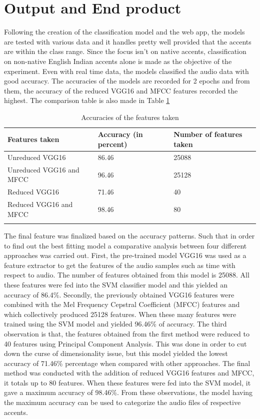 \documentclass[pdflatex]{sn-jnl}%
\theoremstyle{thmstyleone}%
\theoremstyle{thmstyletwo}%
\theoremstyle{thmstylethree}%
\begin{document}
\section{Output and End product}
Following the creation of the classification model and the web app, the models are tested with various data and it handles pretty well provided that the accents are within the class range. Since the focus isn’t on native accents, classification on non-native English Indian accents alone is made as the objective of the experiment. Even with real time data, the models classified the audio data with good accuracy. The accuracies of the models are recorded for 2 epochs and from them, the accuracy of the reduced VGG16 and MFCC features recorded the highest. The comparison table is also made in Table \ref{compare}

\begin{table}[!htbp]
\begin{center}
\caption{Accuracies of the features taken}\label{compare}%
\begin{tabular}{@{}lll@{}}
\toprule
Features taken & Accuracy (in percent) & Number of features taken\\
\midrule
Unreduced VGG16 & 86.46 & 25088 \\
Unreduced VGG16 and MFCC & 96.46 & 25128  \\
Reduced VGG16 & 71.46 & 40 \\
Reduced VGG16 and MFCC & 98.46 & 80 \\
\botrule
\end{tabular}
\end{center}
\end{table}

The final feature was finalized based on the accuracy patterns. Such that in order to find out the best fitting model a comparative analysis between four different approaches was carried out. First, the pre-trained model VGG16 was used as a feature extractor to get the features of the audio samples such as time with respect to audio. The number of features obtained from this model is 25088. All these features were fed into the SVM classifier model and this yielded an accuracy of 86.4\%. Secondly,  the previously obtained VGG16 features were combined with the Mel Frequency Cepstral Coefficient (MFCC) features and which collectively produced 25128 features. When these many features were trained using the SVM model and yielded 96.46\% of accuracy. The third observation is that, the features obtained from the first method were reduced to 40 features using Principal Component Analysis. This was done in order to cut down the curse of dimensionality issue, but this model yielded the lowest accuracy of 71.46\% percentage when compared with other approaches. The final method was conducted with the addition of reduced VGG16 features and MFCC, it totals up to 80 features. When these features were fed into the SVM model, it gave a maximum accuracy of 98.46\%. From these observations, the model having the maximum accuracy can be used to categorize the audio files of respective accents.
\end{document}
